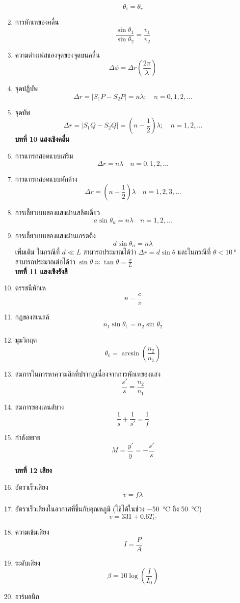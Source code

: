 \documentclass[12pt, a4paper]{article}
\begin{document}
\begin{enumerate}
		\[\theta_i=\theta_r\]
	\item การหักเหของคลื่น
		\[\frac{\sin\theta_1}{\sin\theta_2}=\frac{v_1}{v_2}\]
	\item ความต่างเฟสของจุดของจุดบนคลื่น
		\[\Delta \phi=\Delta r\left(\frac{2\pi}{\lambda}\right)\]
	\item จุดปฏิบัพ
		\[\Delta r=|S_1P-S_2P| = n\lambda;\quad n=0,1,2,\dots\]
	\item จุดบัพ
		\[\Delta r=|S_1Q-S_2Q| = \left(n-\frac{1}{2}\right)\lambda;\quad n=1,2,\dots\]
	\textbf{บทที่ 10 แสงเชิงคลื่น}
	\item การแทรกสอดแบบเสริม
		\[\Delta r=n\lambda\quad n=0,1,2,\dots\]
	\item การแทรกสอดแบบหักล้าง
		\[\Delta r=\left(n-\frac{1}{2}\right)\lambda\quad n=1,2,3,\dots\]
	
	\item การเลี้ยวเบนของแสงผ่านสลิตเดี่ยว
		\[a\sin\theta_n=n\lambda\quad n=1,2,\dots\]
	\item การเลี้ยวเบนของแสงผ่านเกรตติง
		\[d\sin\theta_n=n\lambda\]
	เพิ่มเติม ในกรณีที่ \(d\ll L\) สามารถประมาณได้ว่า \(\Delta r = d\sin\theta\) และในกรณีที่ \(\theta<\SI{10}{\degree}\) สามารถประมาณต่อได้ว่า \(\sin\theta\approx\tan\theta=\frac{x}{L}\)\\
	\textbf{บทที่ 11 แสงเชิงรังสี}
	\item ดรรชนีหักเห
		\[n=\frac{c}{v}\]
	\item กฎของสเนลล์
		\[n_1\sin\theta_1=n_2\sin\theta_2\]
	\item มุมวิกฤต
		\[\theta_\text{c}=\arcsin\left(\frac{n_2}{n_1}\right)\]
	\item สมการในการหาความลึกที่ปรากฏเนื่องจากการหักเหของแสง
		\[\frac{s'}{s}=\frac{n_2}{n_1}\]
	\item สมการของเลนส์บาง
		\[\frac{1}{s}+\frac{1}{s'}=\frac{1}{f}\]
	\item กำลังขยาย
		\[M=\frac{y'}{y}=-\frac{s'}{s}\]
	\begin{center}
	\end{center}
	\textbf{บทที่ 12 เสียง}
	\item อัตราเร็วเสียง
		\[v=f\lambda\]
	\item อัตราเร็วเสียงในอากาศที่ขึ้นกับอุณหภูมิ (ใช้ได้ในช่วง \SI{-50}{\degreeCelsius} ถึง \SI{50}{\degreeCelsius})
		\[v=331+0.6T_\text{C}\]
	\item ความเข้มเสียง
		\[I=\frac{P}{A}\]
	\item ระดับเสียง
		\[\beta=10\log\left(\frac{I}{I_0}\right)\]
	\item ฮาร์มอนิก

\end{enumerate}
\end{document}
